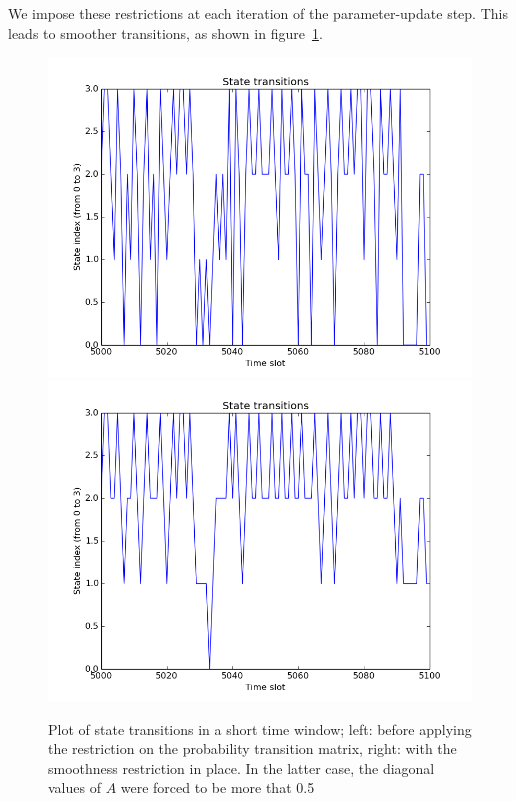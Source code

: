 \documentclass[11pt, twoside]{article}
\begin{document}
We impose these restrictions at each iteration of the parameter-update step. This leads to smoother transitions, as shown in figure~\ref{fig:state-transitions}.
\begin{figure}[h!]
	\centering
	\includegraphics[scale = 0.35]{state-transitions-rough}
	\includegraphics[scale = 0.35]{state-transitions-smooth}
	\caption{Plot of state transitions in a short time window; left: before applying the restriction on the probability transition matrix, right: with the smoothness restriction in place. In the latter case, the diagonal values of $A$ were forced to be more that 0.5}
	\label{fig:state-transitions}
\end{figure}
\end{document}

